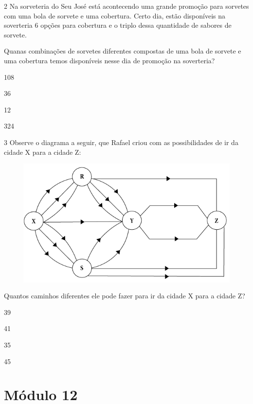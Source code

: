 \pagebreak

\num{2} Na sorveteria do Seu José está acontecendo uma grande promoção
para sorvetes com uma bola de sorvete e uma cobertura. Certo dia, estão disponíveis na soverteria 6 opções para cobertura e o triplo dessa quantidade de sabores de sorvete.

Quanas combinações de sorvetes diferentes compostas de uma bola de
sorvete e uma cobertura temos disponíveis nesse dia de promoção na soverteria?

\begin{escolha}
\item
  108
\item
  36
\item
  12
\item
  324
\end{escolha}


\num{3} Observe o diagrama a seguir, que Rafael criou com as possibilidades de ir da cidade X para a cidade Z:

\begin{figure}[htpb!]
\centering
\includegraphics[width=\textwidth]{../ilustracoes/MAT5/SAEB_5ANO_MAT_figura84.png}
\end{figure}

Quantos caminhos diferentes ele pode fazer para ir da cidade X para a
cidade Z?

\begin{escolha}
\item
  39
\item
  41
\item
  35
\item
  45
\end{escolha}


\chapter{Módulo 12}

